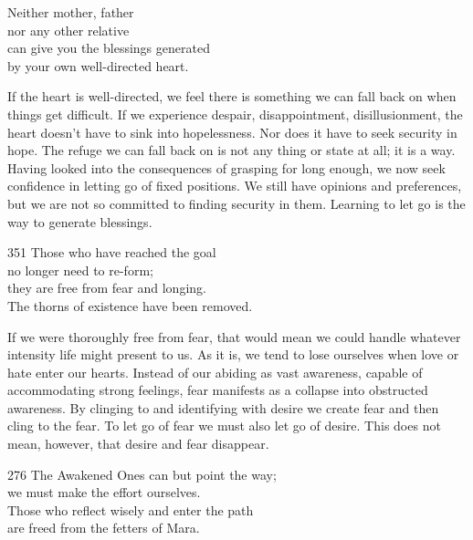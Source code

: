
\begin{dhpVerse}{43}
\label{dhp-43}
Neither mother, father\\
nor any other relative\\
can give you the blessings generated\\
by your own well-directed heart.
\end{dhpVerse}

\begin{dhpRefl}
  If the heart is well-directed, we feel there is something we can fall back on
  when things get difficult. If we experience despair, disappointment,
  disillusionment, the heart doesn’t have to sink into hopelessness. Nor does it
  have to seek security in hope. The refuge we can fall back on is not any thing
  or state at all; it is a way. Having looked into the consequences of grasping
  for long enough, we now seek confidence in letting go of fixed positions. We
  still have opinions and preferences, but we are not so committed to finding
  security in them. Learning to let go is the way to generate blessings.
\end{dhpRefl}


\begin{dhpVerse}{351}
\label{dhp-351}
Those who have reached the goal\\
no longer need to re-form;\\
they are free from fear and longing.\\
The thorns of existence have been removed.
\end{dhpVerse}

\begin{dhpRefl}
  If we were thoroughly free from fear, that would mean we could handle whatever
  intensity life might present to us. As it is, we tend to lose ourselves when
  love or hate enter our hearts. Instead of our abiding as vast awareness,
  capable of accommodating strong feelings, fear manifests as a collapse into
  obstructed awareness. By clinging to and identifying with desire we create
  fear and then cling to the fear. To let go of fear we must also let go of
  desire. This does not mean, however, that desire and fear disappear.
\end{dhpRefl}


\begin{dhpVerse}{276}
\label{dhp-276}
The Awakened Ones can but point the way;\\
we must make the effort ourselves.\\
Those who reflect wisely and enter the path\\
are freed from the fetters of Mara.
\end{dhpVerse}

